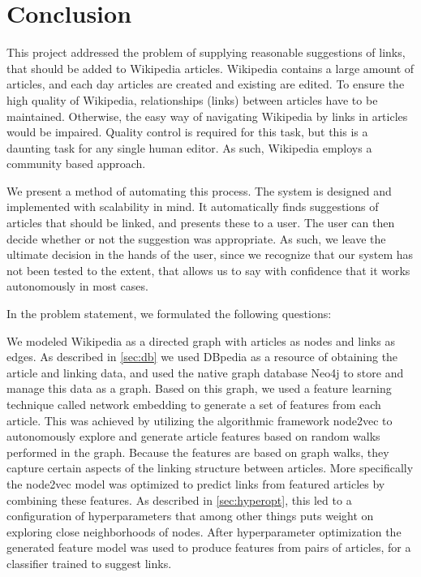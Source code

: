 \chapter{Conclusion}\label{chap:conclusion}
This project addressed the problem of supplying reasonable suggestions of links, that should be added to Wikipedia articles. Wikipedia contains a large amount of articles, and each day articles are created and existing are edited. To ensure the high quality of Wikipedia, relationships (links) between articles have to be maintained. Otherwise, the easy way of navigating Wikipedia by links in articles would be impaired. Quality control is required for this task, but this is a daunting task for any single human editor. As such, Wikipedia employs a community based approach. 

We present a method of automating this process. The system is designed and implemented with scalability in mind. It automatically finds suggestions of articles that should be linked, and presents these to a user. The user can then decide whether or not the suggestion was appropriate. As such, we leave the ultimate decision in the hands of the user, since we recognize that our system has not been tested to the extent, that allows us to say with confidence that it works autonomously in most cases.

In the problem statement, we formulated the following questions:

\subproblems


We modeled Wikipedia as a directed graph with articles as nodes and links as edges. As described in \cref{sec:db} we used DBpedia as a resource of obtaining the article and linking data, and used the native graph database Neo4j to store and manage this data as a graph. Based on this graph, we used a feature learning technique called network embedding to generate a set of features from each article. This was achieved by utilizing the algorithmic framework node2vec to autonomously explore and generate article features based on random walks performed in the graph. Because the features are based on graph walks, they capture certain aspects of the linking structure between articles. More specifically the node2vec model was optimized to predict links from featured articles by combining these features. As described in \cref{sec:hyperopt}, this led to a configuration of hyperparameters that among other things puts weight on exploring close neighborhoods of nodes. After hyperparameter optimization the generated feature model was used to produce features from pairs of articles, for a classifier trained to suggest links.

